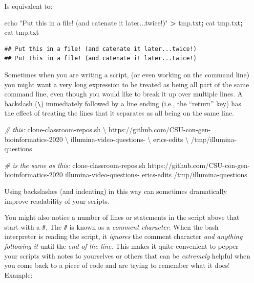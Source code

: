 \documentclass[]{krantz}
\makeatletter
\newenvironment{Shaded}{\begin{snugshade}}{\end{snugshade}}
\newcommand{\BuiltInTok}[1]{#1}
\newcommand{\CommentTok}[1]{\textcolor[rgb]{0.37,0.37,0.37}{\textit{#1}}}
\newcommand{\ExtensionTok}[1]{#1}
\newcommand{\FunctionTok}[1]{\textcolor[rgb]{0,0,0}{#1}}
\newcommand{\KeywordTok}[1]{\textcolor[rgb]{0.27,0.27,0.27}{\textbf{#1}}}
\newcommand{\NormalTok}[1]{#1}
\newcommand{\OperatorTok}[1]{\textcolor[rgb]{0.43,0.43,0.43}{\textbf{#1}}}
\newcommand{\StringTok}[1]{\textcolor[rgb]{0.5,0.5,0.5}{#1}}
\newenvironment{kframe}{%
\medskip{}
\setlength{\fboxsep}{.8em}
 \def\at@end@of@kframe{}%
 \ifinner\ifhmode%
  \def\at@end@of@kframe{\end{minipage}}%
  \begin{minipage}{\columnwidth}%
 \fi\fi%
 \def\FrameCommand##1{\hskip\@totalleftmargin \hskip-\fboxsep
 \colorbox{shadecolor}{##1}\hskip-\fboxsep
     \hskip-\linewidth \hskip-\@totalleftmargin \hskip\columnwidth}%
 \MakeFramed {\advance\hsize-\width
   \@totalleftmargin\z@ \linewidth\hsize
   \@setminipage}}%
 {\par\unskip\endMakeFramed%
 \at@end@of@kframe}
\renewenvironment{Shaded}{\begin{kframe}}{\end{kframe}}
\makeatother
\begin{document}
Is equivalent to:

\begin{Shaded}
\begin{Highlighting}[]
\BuiltInTok{echo} \StringTok{"Put this in a file! (and catenate it later...twice!)"} \OperatorTok{>}\NormalTok{ tmp.txt}\KeywordTok{;} \FunctionTok{cat}\NormalTok{ tmp.txt}\KeywordTok{;} \FunctionTok{cat}\NormalTok{ tmp.txt}
\end{Highlighting}
\end{Shaded}

\begin{verbatim}
## Put this in a file! (and catenate it later...twice!)
## Put this in a file! (and catenate it later...twice!)
\end{verbatim}

Sometimes when you are writing a script, (or even working on the command line) you might want
a very long expression to be treated as being all part of the same command line, even though
you would like to break it up over multiple lines. A backslash (\texttt{\textbackslash{}}) immediately followed by
a line ending (i.e., the ``return'' key) has the effect of treating the lines that it separates
as all being on the same line.

\begin{Shaded}
\begin{Highlighting}[]
\CommentTok{# this:}
\ExtensionTok{clone-classroom-repos.sh}\NormalTok{  \textbackslash{}}
\NormalTok{    https://github.com/CSU-con-gen-bioinformatics-2020  \textbackslash{}}
\NormalTok{    illumina-video-questions- \textbackslash{}}
\NormalTok{    erics-edits  \textbackslash{}}
\NormalTok{    /tmp/illumina-questions}

\CommentTok{# is the same as this:}
\ExtensionTok{clone-classroom-repos.sh}\NormalTok{  https://github.com/CSU-con-gen-bioinformatics-2020  illumina-video-questions- erics-edits  /tmp/illumina-questions}
\end{Highlighting}
\end{Shaded}

Using backslashes (and indenting) in this way can sometimes dramatically improve readability of
your scripts.

You might also notice a number of lines or statements in the script above that start
with a \texttt{\#}. The \texttt{\#} is known as a \emph{comment character}. When the bash interpreter is
reading the script, it \emph{ignores} the comment character \emph{and anything following it} until
the \emph{end of the line}. This makes it quite convenient to pepper your scripts with
notes to yourselves or others that can be \emph{extremely} helpful when you come back
to a piece of code and are trying to remember what it does! Example:
\end{document}
